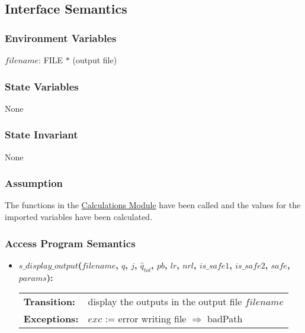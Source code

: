 \documentclass[12pt]{article}
\newcommand{\Calculations}{\hyperref[SecCalc]{Calculations Module}}
\begin{document}
\subsection{Interface Semantics}

\subsubsection{Environment Variables}

$filename$: FILE $\ast$ (output file)

\subsubsection{State Variables}

None

\subsubsection{State Invariant}

None

\subsubsection{Assumption}

The functions in the \Calculations{} have been called and 
the values for the imported variables have been calculated.

\subsubsection{Access Program Semantics}

\begin{itemize}
\item\textbf{$s\_display\_output$($filename$, $q$, $j$, $\hat{q}_{tol}$, $pb$, $lr$, $nrl$, $is\_safe1$, $is\_safe2$, $safe$, $params$):}  \\ \newline
\begin{tabular}{l p{}}
\textbf{Transition:} & display the outputs in the output file $filename$\\
\textbf{Exceptions:} & $exc$ := error writing file $\Rightarrow$ badPath \\
\end{tabular}
\end{itemize}

\end{document}

